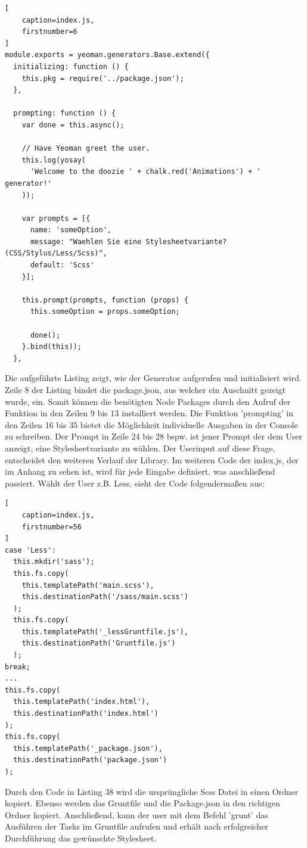 \begin{lstlisting}[
	caption=index.js,
	firstnumber=6
]
module.exports = yeoman.generators.Base.extend({
  initializing: function () {
    this.pkg = require('../package.json');
  },

  prompting: function () {
    var done = this.async();

    // Have Yeoman greet the user.
    this.log(yosay(
      'Welcome to the doozie ' + chalk.red('Animations') + ' generator!'
    ));

    var prompts = [{
      name: 'someOption',
      message: "Waehlen Sie eine Stylesheetvariante? (CSS/Stylus/Less/Scss)",
      default: 'Scss'
    }];

    this.prompt(prompts, function (props) {
      this.someOption = props.someOption;

      done();
    }.bind(this));
  },
\end{lstlisting}
Die aufgeführte Listing zeigt, wie der Generator aufgerufen und initialisiert wird. Zeile 8 der Listing bindet die package.json, aus welcher ein Auschnitt gezeigt wurde, ein.\newline
Somit können die benötigten Node Packages durch den Aufruf der Funktion in den Zeilen 9 bis 13 installiert werden.\newline
Die Funktion 'prompting' in den Zeilen 16 bis 35 bietet die Möglichkeit individuelle Ausgaben in der Console zu schreiben. Der Prompt in Zeile 24 bis 28 bspw. ist jener Prompt der dem User anzeigt, eine Stylesheetvariante zu wählen. Der Userinput auf diese Frage, entscheidet den weiteren Verlauf der Library. Im weiteren Code der index.js, der im Anhang zu sehen ist, wird für jede Eingabe definiert, was anschließend passiert. Wählt der User z.B. Less, sieht der Code folgendermaßen aus:
\begin{lstlisting}[
	caption=index.js,
	firstnumber=56
]
case 'Less':
  this.mkdir('sass');
  this.fs.copy(
    this.templatePath('main.scss'),
    this.destinationPath('/sass/main.scss')
  );
  this.fs.copy(
    this.templatePath('_lessGruntfile.js'),
    this.destinationPath('Gruntfile.js')
  );
break;
...
this.fs.copy(
  this.templatePath('index.html'),
  this.destinationPath('index.html')
);
this.fs.copy(
  this.templatePath('_package.json'),
  this.destinationPath('package.json')
);
\end{lstlisting}
Durch den Code in Listing 38 wird die ursprüngliche Scss Datei in einen Ordner kopiert. Ebenso werden das Gruntfile und die Package.json in den richtigen Ordner kopiert. \newline
Anschließend, kann der user mit dem Befehl 'grunt' das Ausführen der Tasks im Gruntfile aufrufen und erhält nach erfolgreicher Durchführung das gewünschte Stylesheet.
\newline\newline
